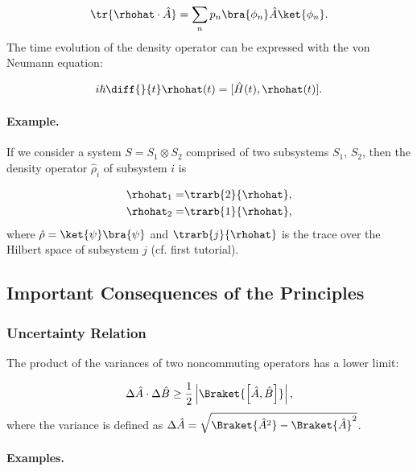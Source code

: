 \begin{align}
				\tr{\rhohat \cdot \hat{A}} = \sum_n {p_n} \bra{\phi_n} \hat{A} \ket{\phi_n}.
			
\end{align}
			The time evolution of the density operator can be expressed with the von Neumann equation:

\begin{align}
				i\hbar \diff{}{t}\rhohat(t) = [\hat{H}(t),\rhohat(t)].
			
\end{align}
				\paragraph{Example.} 
					If we consider a system $S = S_1 \otimes S_2$ comprised of two subsystems $S_1$, $S_2$, then the density operator $\hat{\rho}_i$ of  subsystem $i$ is

\begin{align}
						\rhohat_1=&\trarb{2}{\rhohat},\\
						\rhohat_2=&\trarb{1}{\rhohat},
					
\end{align}
										where $\hat{\rho}=\ket{\psi}\bra{\psi}$ and $\trarb{j}{\rhohat}$ is the trace over the Hilbert space of subsystem $j$ (cf. first tutorial).

\subsection{Important Consequences of the Principles}

\subsubsection{Uncertainty Relation}
				The product of the variances of two noncommuting operators has a lower limit:

\begin{align}
					\Delta \hat{A} \cdot \Delta \hat{B} \geq \frac{1}{2} \left| \Braket{\left[\hat{A},\hat{B}\right]} \right|,
				
\end{align}
				where the variance is defined as $\Delta \hat{A} = \sqrt{\Braket{\hat{A}^2}-\Braket{\hat{A}}^2}$.

\paragraph{Examples.}

